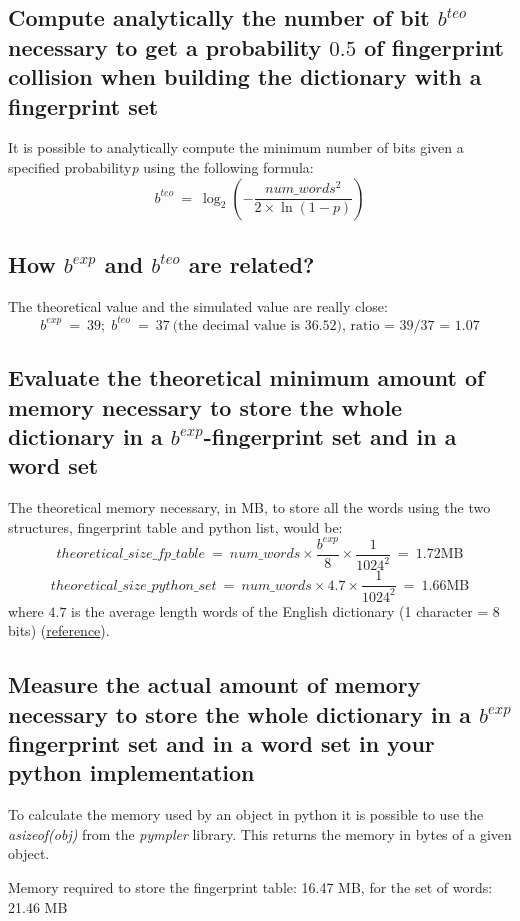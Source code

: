 \documentclass[twocolumn,letterpaper]{report}
\begin{document}
{			\subsection{Compute analytically the number of bit $b^{teo}$ necessary to get a probability $0.5$ of fingerprint collision when building the dictionary with a fingerprint set}
					It is possible to analytically compute the minimum number of bits given a specified probability\emph{p} using the following formula:
					\[
							b^{teo} \: = \: \log_2{ \left( - \frac{num\_words^2}{2\times \ln\left({1-p}\right)} \right)}
					\]
					
			\subsection{How $b^{exp}$ and $b^{teo}$ are related?}
					The theoretical value and the simulated value are really close: 
					\[
							b^{exp} \: = \: 39; \; 	b^{teo} \: = \: 37 \: \text{(the decimal value is 36.52), ratio = 39/37 = 1.07}
					\]
			
			\subsection{Evaluate the theoretical minimum amount of memory necessary to store the whole dictionary in a $b^{exp}$-fingerprint set and in a word set}
			The theoretical memory necessary, in MB, to store all the words using the two structures, fingerprint table and python list, would be:
			\[ theoretical\_size\_fp\_table \: = \: num\_words \times \frac{b^{exp}}{8} \times \frac{1}{1024^2}\: = \: 1.72 \text{MB}\] 
			\[ theoretical\_size\_python\_set \: = \: num\_words \times 4.7 \times \frac{1}{1024^2} \: = \: 1.66 \text{MB}\] 
			where $4.7$ is the average length words of the English dictionary (1 character = 8 bits) (\href{http://norvig.com/mayzner.html}{reference}).
						
			\subsection{Measure the actual amount of memory necessary to store the whole dictionary in a $b^{exp}$ fingerprint set and in a word set in your python implementation}
			To calculate the memory used by an object in python it is possible to use the \emph{asizeof(obj)} from the \emph{pympler} library. This returns the memory in bytes of a given object.
			\begin{center}
					Memory required to store the fingerprint table: 16.47 MB, for the set of words: 21.46 MB
			\end{center}
			
}
\end{document}
